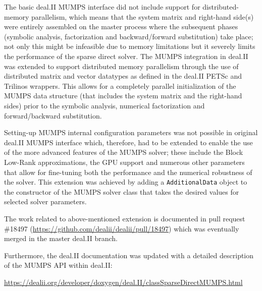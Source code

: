 \documentclass[a4paper,12pt]{article}
\begin{document}
The basic deal.II MUMPS interface did not include support for
distributed-memory parallelism, which means that the system matrix and
right-hand side(s) were entirely assembled on the master process where
the subsequent phases (symbolic analysis, factorization and
backward/forward substitution) take place; not only this might be
infeasible due to memory limitations but it severely limits the
performance of the sparse direct solver. The MUMPS integration in
deal.II was extended to support distributed memory parallelism through
the use of distributed matrix and vector datatypes as defined in the
deal.II PETSc and Trilinos wrappers. This allows for a completely
parallel initialization of the MUMPS data structure (that includes the
system matrix and the right-hand sides) prior to the symbolic
analysis, numerical factorization and forward/backward substitution.

Setting-up MUMPS internal configuration parameters was not possible in
original deal.II MUMPS interface which, therefore, had to be
extended to enable the use of the more advanced features of the MUMPS
solver; these include the Block Low-Rank approximations, the GPU
support and numerous other parameters that allow for fine-tuning both
the performance and the numerical robustness of the solver. This
extension was achieved by adding a \texttt{AdditionalData} object
to the constructor of the MUMPS solver class that takes the desired
values for selected solver parameters.

The work related to above-mentioned extension is documented in pull
request \#18497 (\url{https://github.com/dealii/dealii/pull/18497})
which was eventually merged in the master deal.II branch.

Furthermore, the deal.II documentation was updated with a detailed description
of the MUMPS API within deal.II:

\url{https://dealii.org/developer/doxygen/deal.II/classSparseDirectMUMPS.html}
\end{document}
